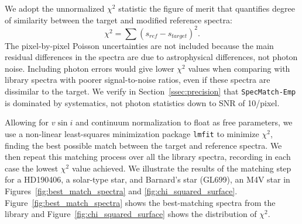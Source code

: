 \documentclass[preprint2]{aastex6}
\newcommand{\SpecMatch}{\texttt{SpecMatch-Emp}\xspace}
\newcommand{\chisq}{\ensuremath{\chi^2}\xspace}
\newcommand{\vsini}{\ensuremath{v \sin i}\xspace}
\newcommand{\angstrom}{\AA\xspace}
\begin{document}
We adopt the unnormalized $\chi^2$ statistic the figure of merit that quantifies degree of similarity between the target and modified reference spectra:
\begin{displaymath}
	\chi^2 = \sum(s_{ref} - s_{target})^2.
\end{displaymath}
The pixel-by-pixel Poisson uncertainties are not included because the main residual differences in the spectra are due to astrophysical differences, not photon noise. Including photon errors would give lower \chisq values when comparing with library spectra with poorer signal-to-noise ratios, even if these spectra are dissimilar to the target. We verify in Section~\ref{ssec:precision} that \SpecMatch is dominated by systematics, not photon statistics down to SNR of 10/pixel.

Allowing for \vsini and continuum normalization to float as free parameters, we use a non-linear least-squares minimization package \texttt{lmfit} \citep{lmfit} to minimize \chisq, finding the best possible match between the target and reference spectra. We then repeat this matching process over all the library spectra, recording in each case the lowest \chisq value achieved. We illustrate the results of the matching step for a HD190406, a solar-type star, and Barnard's star (GL699), an M4V star in Figures~\ref{fig:best_match_spectra} and \ref{fig:chi_squared_surface}. Figure~\ref{fig:best_match_spectra} shows the best-matching spectra from the library and Figure~\ref{fig:chi_squared_surface} shows the distribution of \chisq.

\begin{figure*}
	\caption{Best matching library spectra to HD190406 (top) and GL699 (bottom). The modified reference spectra are the library spectra after applying a broadening kernel and fitting a cubic spline to the continuum (see \autoref{ssec:matching}).\label{fig:best_match_spectra}} 
\end{figure*}

\begin{figure*}
	\caption{Best chi-squared values for the matches between the spectrum of HD190406 (top) and GL699 (bottom) with each library spectrum, plotted against the library star parameters (see \autoref{ssec:matching}). The stars with the five lowest chi-squared values are displayed in red, and we see that there is a sharp minimum in chi-squared close to the true target parameters, indicated with a vertical line. This match was performed in the wavelength region 5300 - 5400 \angstrom. \label{fig:chi_squared_surface}}
\end{figure*}
\end{document}

